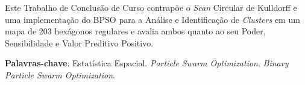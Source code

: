 \documentclass[
	12pt,				%
	openright,			%
	twoside,			%
	a4paper,			%
	english,			%
	french,				%
	spanish,			%
	brazil				%
	]{abntex2}
\begin{document}
%
%



\setlength{\absparsep}{18pt} %
\begin{resumo}
Este Trabalho de Conclusão de Curso contrapõe o \textit{Scan} Circular de Kulldorff e uma implementação do BPSO para a Análise e Identificação de \textit{Clusters} em um mapa de 203 hexágonos regulares e avalia ambos quanto ao seu Poder, Sensibilidade e Valor Preditivo Positivo.

  \textbf{Palavras-chave}: Estatística Espacial. \textit{Particle Swarm Optimization}. \textit{Binary Particle Swarm Optimization}. 

\end{resumo}
\end{document}
